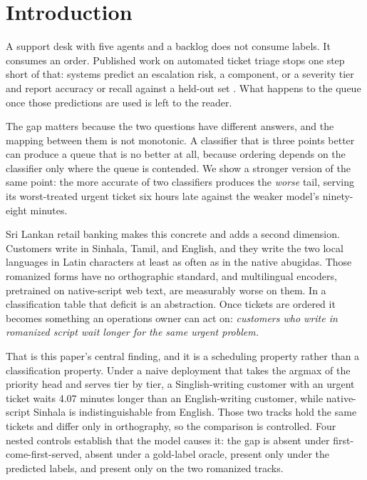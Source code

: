 \section{Introduction}
\label{sec:intro}

A support desk with five agents and a backlog does not consume labels. It
consumes an order. Published work on automated ticket triage stops one step
short of that: systems predict an escalation risk, a component, or a severity
tier and report accuracy or recall against a held-out set
\cite{montgomery2018escalation,mani2019deeptriage,lee2017industrialtriage}. What
happens to the queue once those predictions are used is left to the reader.

The gap matters because the two questions have different answers, and the
mapping between them is not monotonic. A classifier that is three points better
can produce a queue that is no better at all, because ordering depends on the
classifier only where the queue is contended. We show a stronger version of the
same point: the more accurate of two classifiers produces the \emph{worse} tail,
serving its worst-treated urgent ticket six hours late against the weaker
model's ninety-eight minutes.

Sri Lankan retail banking makes this concrete and adds a second dimension.
Customers write in Sinhala, Tamil, and English, and they write the two local
languages in Latin characters at least as often as in the native abugidas. Those
romanized forms have no orthographic standard, and multilingual encoders,
pretrained on native-script web text, are measurably worse on them. In a
classification table that deficit is an abstraction. Once tickets are ordered it
becomes something an operations owner can act on: \emph{customers who write in
romanized script wait longer for the same urgent problem.}

That is this paper's central finding, and it is a scheduling property rather than
a classification property. Under a naive deployment that takes the argmax of the
priority head and serves tier by tier, a Singlish-writing customer with an
urgent ticket waits 4.07 minutes longer than an English-writing customer, while
native-script Sinhala is indistinguishable from English. Those two tracks hold
the same tickets and differ only in orthography, so the comparison is
controlled. Four nested
controls establish that the model causes it: the gap is absent under
first-come-first-served, absent under a gold-label oracle, present only under the
predicted labels, and present only on the two romanized tracks.

